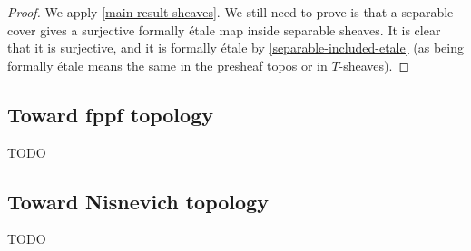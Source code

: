 \begin{proof}
We apply \cref{main-result-sheaves}. We still need to prove is that a separable cover gives a surjective formally étale map inside separable sheaves. It is clear that it is surjective, and it is formally étale by \cref{separable-included-etale} (as being formally étale means the same in the presheaf topos or in $T$-sheaves).
\end{proof}

\subsection{Toward fppf topology}

TODO

\subsection{Toward Nisnevich topology}

TODO

